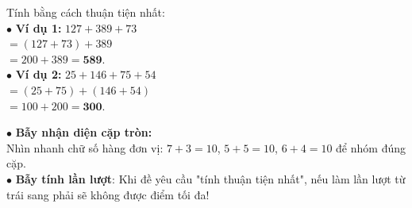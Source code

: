 \documentclass[14pt,a4paper,oneside]{extbook}
\begin{document}
\noindent
\begin{minipage}[t]{0.53\textwidth}
  \begin{tcolorbox}[
    enhanced,
    title={\footnotesize\bfseries\color{white}\faCheckCircle\ Ví dụ thực hành chuẩn mực},
    colback=green!2!white,
    colframe=green!60!black,
    arc=2.5mm, boxrule=0.8pt, top=1.8mm, bottom=1.8mm, left=2.2mm, right=2.2mm
  ]
    \footnotesize
    Tính bằng cách thuận tiện nhất:\\
    $\bullet$ \textbf{Ví dụ 1:} $127 + 389 + 73$\\
    $= (127 + 73) + 389$\\
    $= 200 + 389 = \mathbf{589}$.\\[1mm]
    $\bullet$ \textbf{Ví dụ 2:} $25 + 146 + 75 + 54$\\
    $= (25 + 75) + (146 + 54)$\\
    $= 100 + 200 = \mathbf{300}$.
  \end{tcolorbox}
\end{minipage}%
\hfill
\begin{minipage}[t]{0.45\textwidth}
  \begin{tcolorbox}[
    enhanced,
    title={\footnotesize\bfseries\color{white}\faExclamationTriangle\ Mẹo tránh bẫy trắc nghiệm},
    colback=red!2!white,
    colframe=red!70!black,
    arc=2.5mm, boxrule=0.8pt, top=1.8mm, bottom=1.8mm, left=2.2mm, right=2.2mm
  ]
    \footnotesize
    $\bullet$ \textbf{Bẫy nhận diện cặp tròn:}\\
    Nhìn nhanh chữ số hàng đơn vị: $7 + 3 = 10$, $5 + 5 = 10$, $6 + 4 = 10$ để nhóm đúng cặp.\\
    $\bullet$ \textbf{Bẫy tính lần lượt}: Khi đề yêu cầu "tính thuận tiện nhất", nếu làm lần lượt từ trái sang phải sẽ không được điểm tối đa!
  \end{tcolorbox}
\end{minipage}
\end{document}
